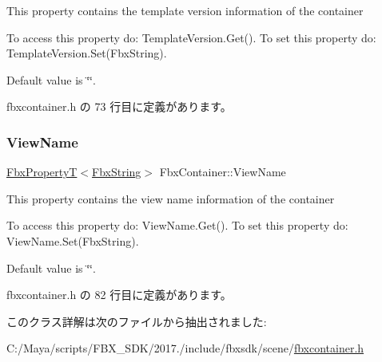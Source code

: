 This property contains the template version information of the container

To access this property do\+: Template\+Version.\+Get(). To set this property do\+: Template\+Version.\+Set(\+Fbx\+String).

Default value is \char`\"{}\char`\"{}. 

 fbxcontainer.\+h の 73 行目に定義があります。

\mbox{\label{class_fbx_container_afdbbb7add5452cf3ee2fcf13c47a00cf}} 
\subsubsection{\texorpdfstring{View\+Name}{ViewName}}
{\footnotesize\ttfamily \hyperlink{class_fbx_property_t}{Fbx\+PropertyT}$<$\hyperlink{class_fbx_string}{Fbx\+String}$>$ Fbx\+Container\+::\+View\+Name}

This property contains the view name information of the container

To access this property do\+: View\+Name.\+Get(). To set this property do\+: View\+Name.\+Set(\+Fbx\+String).

Default value is \char`\"{}\char`\"{}. 

 fbxcontainer.\+h の 82 行目に定義があります。



このクラス詳解は次のファイルから抽出されました\+:\begin{DoxyCompactItemize}
\item 
C\+:/\+Maya/scripts/\+F\+B\+X\+\_\+\+S\+D\+K/2017./include/fbxsdk/scene/\hyperlink{fbxcontainer_8h}{fbxcontainer.\+h}\end{DoxyCompactItemize}
